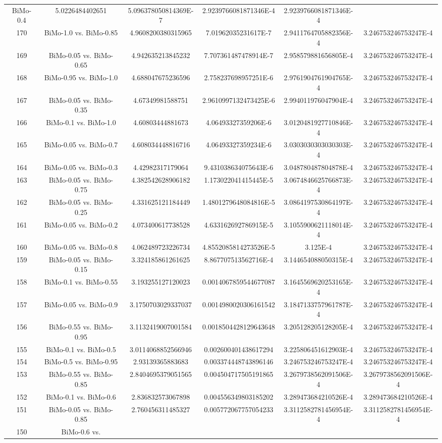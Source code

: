 \documentclass[a4paper,10pt]{article}
\begin{document}
\begin{landscape}
\begin{table}[!htp]
\begin{tabular}{cccccc}
BiMo-0.4&5.0226484402651&5.096378050814369E-7&2.9239766081871346E-4&2.9239766081871346E-4\\170&BiMo-1.0 vs. BiMo-0.85&4.9608200380315965&7.01962035231617E-7&2.9411764705882356E-4&3.246753246753247E-4\\169&BiMo-0.05 vs. BiMo-0.65&4.942635213845232&7.707361487478914E-7&2.958579881656805E-4&3.246753246753247E-4\\168&BiMo-0.95 vs. BiMo-1.0&4.688047675236596&2.758237698957251E-6&2.9761904761904765E-4&3.246753246753247E-4\\167&BiMo-0.05 vs. BiMo-0.35&4.67349981588751&2.9610997132473425E-6&2.994011976047904E-4&3.246753246753247E-4\\166&BiMo-0.1 vs. BiMo-1.0&4.60803444881673&4.06493327359206E-6&3.0120481927710846E-4&3.246753246753247E-4\\165&BiMo-0.05 vs. BiMo-0.7&4.608034448816716&4.06493327359234E-6&3.0303030303030303E-4&3.246753246753247E-4\\164&BiMo-0.05 vs. BiMo-0.3&4.42982317179064&9.431038634075643E-6&3.048780487804878E-4&3.246753246753247E-4\\163&BiMo-0.05 vs. BiMo-0.75&4.382542628906182&1.173022041415445E-5&3.0674846625766873E-4&3.246753246753247E-4\\162&BiMo-0.05 vs. BiMo-0.25&4.331625121184449&1.4801279648084816E-5&3.0864197530864197E-4&3.246753246753247E-4\\161&BiMo-0.05 vs. BiMo-0.2&4.073400617738528&4.633162692786915E-5&3.1055900621118014E-4&3.246753246753247E-4\\160&BiMo-0.05 vs. BiMo-0.8&4.062489723226734&4.8552085814273526E-5&3.125E-4&3.246753246753247E-4\\159&BiMo-0.05 vs. BiMo-0.15&3.324185861261625&8.867707513562716E-4&3.144654088050315E-4&3.246753246753247E-4\\158&BiMo-0.1 vs. BiMo-0.55&3.193255127120023&0.0014067859544677087&3.1645569620253165E-4&3.246753246753247E-4\\157&BiMo-0.05 vs. BiMo-0.9&3.1750703029337037&0.0014980020306161542&3.1847133757961787E-4&3.246753246753247E-4\\156&BiMo-0.55 vs. BiMo-0.95&3.1132419007001584&0.0018504428129643648&3.205128205128205E-4&3.246753246753247E-4\\155&BiMo-0.1 vs. BiMo-0.5&3.0114068852566946&0.002600401438617294&3.225806451612903E-4&3.246753246753247E-4\\154&BiMo-0.5 vs. BiMo-0.95&2.93139365883683&0.003374448743896146&3.246753246753247E-4&3.246753246753247E-4\\153&BiMo-0.55 vs. BiMo-0.85&2.8404695379051565&0.004504717505191865&3.2679738562091506E-4&3.2679738562091506E-4\\152&BiMo-0.1 vs. BiMo-0.6&2.836832573067898&0.004556349803185202&3.289473684210526E-4&3.289473684210526E-4\\151&BiMo-0.05 vs. BiMo-0.85&2.760456311485327&0.005772067757054233&3.3112582781456954E-4&3.3112582781456954E-4\\150&BiMo-0.6 vs. 
\end{tabular}
\end{table}
\end{landscape}
\end{document}
